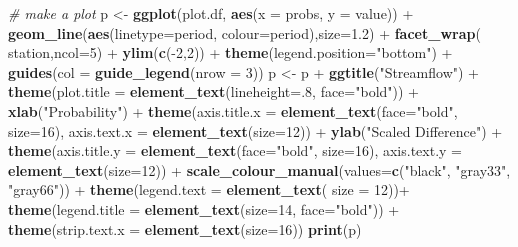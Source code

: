 \documentclass[]{article}
\newenvironment{Shaded}{\begin{snugshade}}{\end{snugshade}}
\newcommand{\KeywordTok}[1]{\textcolor[rgb]{0.13,0.29,0.53}{\textbf{{#1}}}}
\newcommand{\DataTypeTok}[1]{\textcolor[rgb]{0.13,0.29,0.53}{{#1}}}
\newcommand{\DecValTok}[1]{\textcolor[rgb]{0.00,0.00,0.81}{{#1}}}
\newcommand{\FloatTok}[1]{\textcolor[rgb]{0.00,0.00,0.81}{{#1}}}
\newcommand{\StringTok}[1]{\textcolor[rgb]{0.31,0.60,0.02}{{#1}}}
\newcommand{\CommentTok}[1]{\textcolor[rgb]{0.56,0.35,0.01}{\textit{{#1}}}}
\newcommand{\NormalTok}[1]{{#1}}
\begin{document}
\begin{Shaded}
\begin{Highlighting}[]
\CommentTok{# make a plot}
\NormalTok{p <-}\StringTok{ }\KeywordTok{ggplot}\NormalTok{(plot.df, }\KeywordTok{aes}\NormalTok{(}\DataTypeTok{x =} \NormalTok{probs, }\DataTypeTok{y =} \NormalTok{value)) +}
\StringTok{  }\KeywordTok{geom_line}\NormalTok{(}\KeywordTok{aes}\NormalTok{(}\DataTypeTok{linetype=}\NormalTok{period, }\DataTypeTok{colour=}\NormalTok{period),}\DataTypeTok{size=}\FloatTok{1.2}\NormalTok{) +}\StringTok{ }
\StringTok{  }\KeywordTok{facet_wrap}\NormalTok{(~}\StringTok{ }\NormalTok{station,}\DataTypeTok{ncol=}\DecValTok{5}\NormalTok{) +}\StringTok{ }\KeywordTok{ylim}\NormalTok{(}\KeywordTok{c}\NormalTok{(-}\DecValTok{2}\NormalTok{,}\DecValTok{2}\NormalTok{)) +}
\StringTok{  }\KeywordTok{theme}\NormalTok{(}\DataTypeTok{legend.position=}\StringTok{"bottom"}\NormalTok{) +}
\StringTok{  }\KeywordTok{guides}\NormalTok{(}\DataTypeTok{col =} \KeywordTok{guide_legend}\NormalTok{(}\DataTypeTok{nrow =} \DecValTok{3}\NormalTok{))}
\NormalTok{p <-}\StringTok{ }\NormalTok{p +}\StringTok{ }\KeywordTok{ggtitle}\NormalTok{(}\StringTok{"Streamflow"}\NormalTok{) +}
\StringTok{  }\KeywordTok{theme}\NormalTok{(}\DataTypeTok{plot.title =} \KeywordTok{element_text}\NormalTok{(}\DataTypeTok{lineheight=}\NormalTok{.}\DecValTok{8}\NormalTok{, }\DataTypeTok{face=}\StringTok{"bold"}\NormalTok{)) +}
\StringTok{  }\KeywordTok{xlab}\NormalTok{(}\StringTok{"Probability"}\NormalTok{) +}
\StringTok{  }\KeywordTok{theme}\NormalTok{(}\DataTypeTok{axis.title.x =} \KeywordTok{element_text}\NormalTok{(}\DataTypeTok{face=}\StringTok{"bold"}\NormalTok{,  }\DataTypeTok{size=}\DecValTok{16}\NormalTok{),}
        \DataTypeTok{axis.text.x  =} \KeywordTok{element_text}\NormalTok{(}\DataTypeTok{size=}\DecValTok{12}\NormalTok{)) +}
\StringTok{  }\KeywordTok{ylab}\NormalTok{(}\StringTok{"Scaled Difference"}\NormalTok{) +}
\StringTok{  }\KeywordTok{theme}\NormalTok{(}\DataTypeTok{axis.title.y =} \KeywordTok{element_text}\NormalTok{(}\DataTypeTok{face=}\StringTok{"bold"}\NormalTok{,  }\DataTypeTok{size=}\DecValTok{16}\NormalTok{),}
        \DataTypeTok{axis.text.y  =} \KeywordTok{element_text}\NormalTok{(}\DataTypeTok{size=}\DecValTok{12}\NormalTok{)) +}
\StringTok{ }\KeywordTok{scale_colour_manual}\NormalTok{(}\DataTypeTok{values=}\KeywordTok{c}\NormalTok{(}\StringTok{"black"}\NormalTok{, }\StringTok{"gray33"}\NormalTok{, }\StringTok{"gray66"}\NormalTok{)) +}
\StringTok{  }\KeywordTok{theme}\NormalTok{(}\DataTypeTok{legend.text =} \KeywordTok{element_text}\NormalTok{( }\DataTypeTok{size =} \DecValTok{12}\NormalTok{))+}
\StringTok{  }\KeywordTok{theme}\NormalTok{(}\DataTypeTok{legend.title =} \KeywordTok{element_text}\NormalTok{(}\DataTypeTok{size=}\DecValTok{14}\NormalTok{, }\DataTypeTok{face=}\StringTok{"bold"}\NormalTok{)) +}
\StringTok{  }\KeywordTok{theme}\NormalTok{(}\DataTypeTok{strip.text.x =} \KeywordTok{element_text}\NormalTok{(}\DataTypeTok{size=}\DecValTok{16}\NormalTok{))}
\KeywordTok{print}\NormalTok{(p)}
\end{Highlighting}
\end{Shaded}
\end{document}
